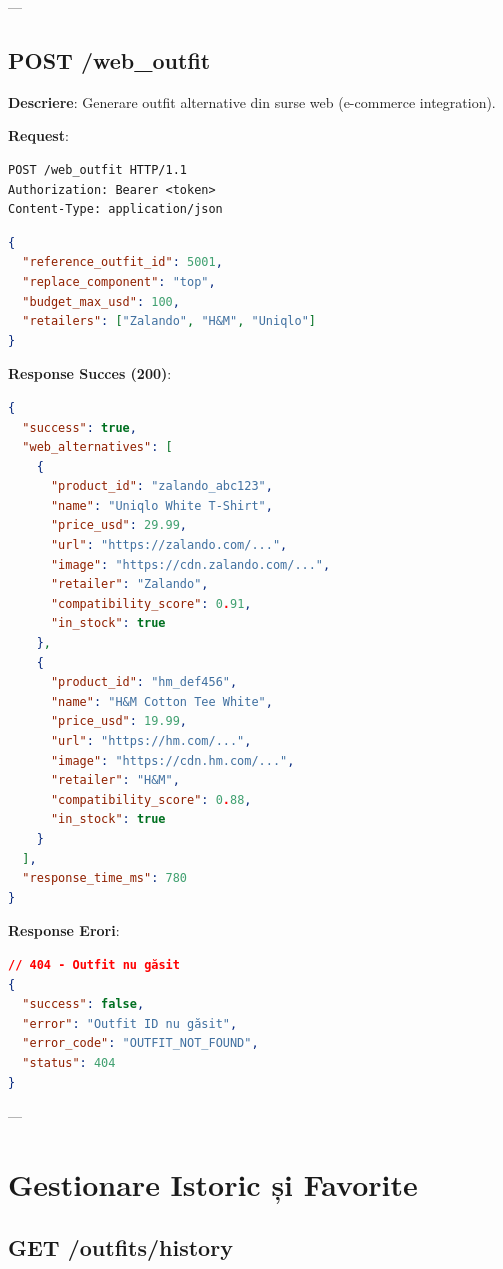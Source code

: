 ---

\subsection{POST /web\_outfit}

\textbf{Descriere}: Generare outfit alternative din surse web (e-commerce integration).

\textbf{Request}:

\begin{lstlisting}[language=HTTP]
POST /web_outfit HTTP/1.1
Authorization: Bearer <token>
Content-Type: application/json
\end{lstlisting}

\begin{lstlisting}[language=JSON]
{
  "reference_outfit_id": 5001,
  "replace_component": "top",
  "budget_max_usd": 100,
  "retailers": ["Zalando", "H&M", "Uniqlo"]
}
\end{lstlisting}

\textbf{Response Succes (200)}:

\begin{lstlisting}[language=JSON]
{
  "success": true,
  "web_alternatives": [
    {
      "product_id": "zalando_abc123",
      "name": "Uniqlo White T-Shirt",
      "price_usd": 29.99,
      "url": "https://zalando.com/...",
      "image": "https://cdn.zalando.com/...",
      "retailer": "Zalando",
      "compatibility_score": 0.91,
      "in_stock": true
    },
    {
      "product_id": "hm_def456",
      "name": "H&M Cotton Tee White",
      "price_usd": 19.99,
      "url": "https://hm.com/...",
      "image": "https://cdn.hm.com/...",
      "retailer": "H&M",
      "compatibility_score": 0.88,
      "in_stock": true
    }
  ],
  "response_time_ms": 780
}
\end{lstlisting}

\textbf{Response Erori}:

\begin{lstlisting}[language=JSON]
// 404 - Outfit nu găsit
{
  "success": false,
  "error": "Outfit ID nu găsit",
  "error_code": "OUTFIT_NOT_FOUND",
  "status": 404
}
\end{lstlisting}

---

\section{Gestionare Istoric și Favorite}

\subsection{GET /outfits/history}

